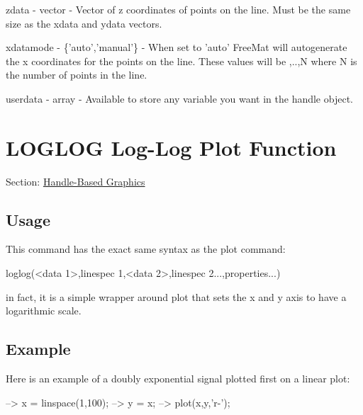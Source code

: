 \begin{DoxyItemize}
\item {\ttfamily zdata} -\/ {\ttfamily vector} -\/ Vector of z coordinates of points on the line. Must be the same size as the {\ttfamily xdata} and {\ttfamily ydata} vectors.  
\item {\ttfamily xdatamode} -\/ {\ttfamily \{'auto','manual'\}} -\/ When set to {\ttfamily 'auto'} Free\-Mat will autogenerate the x coordinates for the points on the line. These values will be {,..,N} where {\ttfamily N} is the number of points in the line.  
\item {\ttfamily userdata} -\/ {\ttfamily array} -\/ Available to store any variable you want in the handle object.  
\end{DoxyItemize}\hypertarget{handle_loglog}{}\section{L\-O\-G\-L\-O\-G Log-\/\-Log Plot Function}\label{handle_loglog}
Section\-: \hyperlink{sec_handle}{Handle-\/\-Based Graphics} \hypertarget{vtkwidgets_vtkxyplotwidget_Usage}{}\subsection{Usage}\label{vtkwidgets_vtkxyplotwidget_Usage}
This command has the exact same syntax as the {\ttfamily plot} command\-: \begin{DoxyVerb}  loglog(<data 1>,{linespec 1},<data 2>,{linespec 2}...,properties...)
\end{DoxyVerb}
 in fact, it is a simple wrapper around {\ttfamily plot} that sets the x and y axis to have a logarithmic scale. \hypertarget{variables_struct_Example}{}\subsection{Example}\label{variables_struct_Example}
Here is an example of a doubly exponential signal plotted first on a linear plot\-:


\begin{DoxyVerbInclude}
--> x = linspace(1,100);
--> y = x;
--> plot(x,y,'r-');
\end{DoxyVerbInclude}


